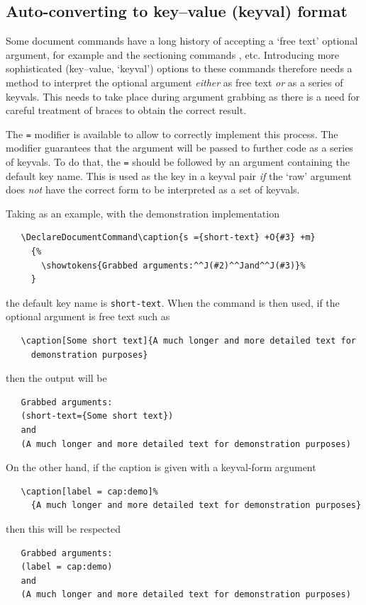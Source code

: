 \documentclass{ltxguide}
\begin{document}
\subsection{Auto-converting to key--value (keyval) format}
\label{sec:cmd:keyval}

Some document commands have a long history of accepting a `free text' optional
argument, for example  and the sectioning commands ,
etc. Introducing more sophisticated (key--value, `keyval') options to these commands
therefore needs a method to interpret the optional argument \emph{either} as
free text \emph{or} as a series of keyvals. This needs to take place
during argument grabbing as there is a need for careful treatment of
braces to obtain the correct result.

The \texttt{=} modifier is available to allow  to correctly
implement this process. The modifier guarantees that the argument will be
passed to further code as a series of keyvals. To do that, the \texttt{=}
should be followed by an argument containing the default key name. This is used
as the key in a keyval pair \emph{if} the `raw' argument does \emph{not}
have the correct form to be interpreted as a set of keyvals.

Taking  as an example, with the demonstration implementation
\begin{verbatim}
   \DeclareDocumentCommand\caption{s ={short-text} +O{#3} +m}
     {%
       \showtokens{Grabbed arguments:^^J(#2)^^Jand^^J(#3)}%
     }
\end{verbatim}
the default key name is \texttt{short-text}. When the command  is
then used, if the optional argument is free text such as
\begin{verbatim}
   \caption[Some short text]{A much longer and more detailed text for
     demonstration purposes}
\end{verbatim}
then the output will be
\begin{verbatim}
   Grabbed arguments:
   (short-text={Some short text})
   and
   (A much longer and more detailed text for demonstration purposes)
\end{verbatim}
On the other hand, if the caption is given with a keyval-form argument
\begin{verbatim}
   \caption[label = cap:demo]%
     {A much longer and more detailed text for demonstration purposes}
\end{verbatim}
then this will be respected
\begin{verbatim}
   Grabbed arguments:
   (label = cap:demo)
   and
   (A much longer and more detailed text for demonstration purposes)
\end{verbatim}
\end{document}
